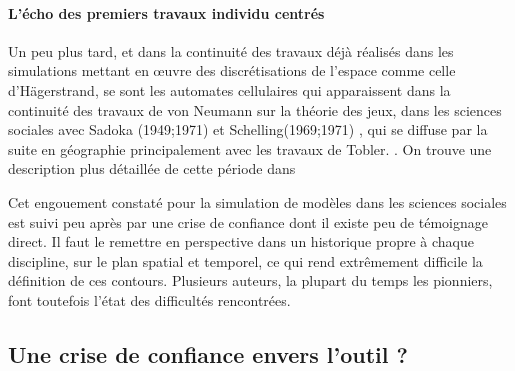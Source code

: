
\paragraph{L'écho des premiers travaux individu centrés}

Un peu plus tard, et dans la continuité des travaux déjà réalisés dans les simulations mettant en œuvre des discrétisations de l'espace comme celle d'Hägerstrand, se sont les automates cellulaires qui apparaissent dans la continuité des travaux de von Neumann sur la théorie des jeux, dans les sciences sociales avec Sadoka (1949;1971) et Schelling(1969;1971) \autocite{Ganguly2003}, qui se diffuse par la suite en géographie principalement avec les travaux de Tobler. \autocites{Tobler1970b,Tobler1979}. On trouve une description plus détaillée de cette période dans \autocite{Louail2010}



Cet engouement constaté pour la simulation de modèles dans les sciences sociales est suivi peu après par une crise de confiance dont il existe peu de témoignage direct. Il faut le remettre en perspective dans un historique propre à chaque discipline, sur le plan spatial et temporel, ce qui rend extrêmement difficile la définition de ces contours. Plusieurs auteurs, la plupart du temps les pionniers, font toutefois l'état des difficultés rencontrées.


\subsection{Une crise de confiance envers l'outil ?}
\label{sec:critiques_simulation}

